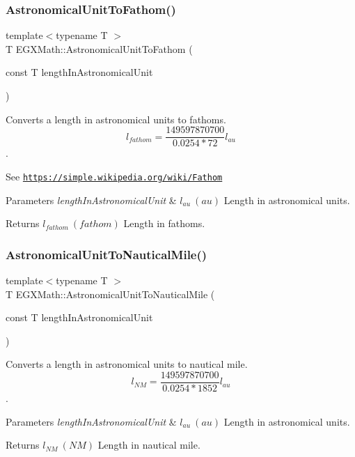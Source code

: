\subsubsection{\texorpdfstring{Astronomical\+Unit\+To\+Fathom()}{AstronomicalUnitToFathom()}}
{\footnotesize\ttfamily template$<$typename T $>$ \\
T E\+G\+X\+Math\+::\+Astronomical\+Unit\+To\+Fathom (\begin{DoxyParamCaption}\item[{const T}]{length\+In\+Astronomical\+Unit }\end{DoxyParamCaption})}



Converts a length in astronomical units to fathoms. \[ l_{fathom}= \frac{149597870700}{0.0254 * 72} l_{au} \]. 

See \href{https://simple.wikipedia.org/wiki/Fathom}{\tt https\+://simple.\+wikipedia.\+org/wiki/\+Fathom} 
\begin{DoxyParams}{Parameters}
{\em length\+In\+Astronomical\+Unit} & $ l_{au}\ (au)$ Length in astronomical units. \\
\hline
\end{DoxyParams}
\begin{DoxyReturn}{Returns}
$ l_{fathom}\ (fathom)$ Length in fathoms. 
\end{DoxyReturn}
\mbox{\label{group___e_g_x_math-_conversions-_length_conversions-_astronomical-_astronomical_unit-_nautical_ga1d18851a119546f6a8e95e3051559f2e}} 
\subsubsection{\texorpdfstring{Astronomical\+Unit\+To\+Nautical\+Mile()}{AstronomicalUnitToNauticalMile()}}
{\footnotesize\ttfamily template$<$typename T $>$ \\
T E\+G\+X\+Math\+::\+Astronomical\+Unit\+To\+Nautical\+Mile (\begin{DoxyParamCaption}\item[{const T}]{length\+In\+Astronomical\+Unit }\end{DoxyParamCaption})}



Converts a length in astronomical units to nautical mile. \[ l_{NM}= \frac{149597870700}{0.0254 * 1852} l_{au} \]. 


\begin{DoxyParams}{Parameters}
{\em length\+In\+Astronomical\+Unit} & $ l_{au}\ (au)$ Length in astronomical units. \\
\hline
\end{DoxyParams}
\begin{DoxyReturn}{Returns}
$ l_{NM}\ (NM)$ Length in nautical mile. 
\end{DoxyReturn}
